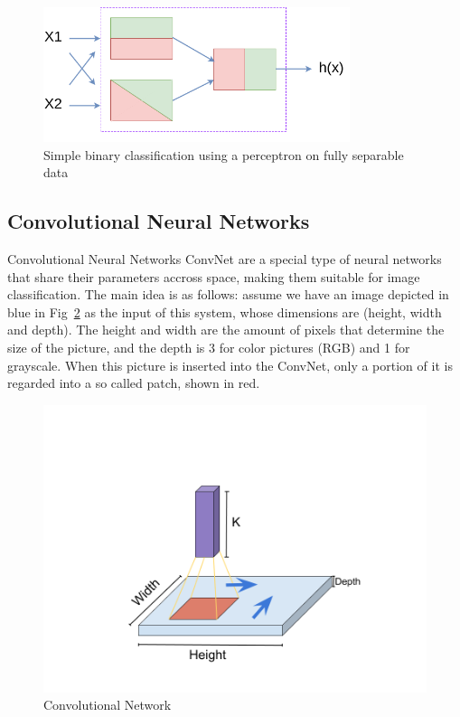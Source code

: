 \begin{figure}[!htb]
    \centering
      \includegraphics[width=0.8\textwidth]{figures/neuralnetwork}
      \caption{Simple binary classification using a perceptron on fully separable data}
      \label{fig:neuralnetwork}
\end{figure}

\subsection{Convolutional Neural Networks}

Convolutional Neural Networks \ac{ConvNet} are a special type of neural networks that share their parameters accross space, making them suitable for image classification. The main idea is as follows: assume we have an image depicted in blue in Fig~\ref{fig:convolutionalnetwork} as the input of this system, whose dimensions are (height, width and depth). The height and width are the amount of pixels that determine the size of the picture, and the depth is 3 for color pictures (RGB) and 1 for grayscale. When this picture is inserted into the \ac{ConvNet}, only a portion of it is regarded into a so called patch, shown in red.

\begin{figure}[!t]
    \centering
      \includegraphics[width=\textwidth]{figures/convolutionalnetwork}
      \caption{Convolutional Network}
      \label{fig:convolutionalnetwork}
\end{figure}

